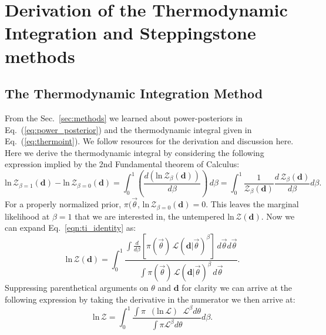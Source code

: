 \section{Derivation of the Thermodynamic Integration and Steppingstone methods}\label{sec:ti_ss_method_derivation}
\subsection{The Thermodynamic Integration Method}
From the Sec.~\ref{sec:methods} we learned about power-posteriors in Eq.~(\ref{eq:power_posterior}) and the thermodynamic integral given in Eq.~(\ref{eq:thermoint}). We follow resources \citep{annis2019thermodynamic} for the derivation and discussion here. Here we derive the thermodynamic integral by considering the following expression implied by the 2nd Fundamental theorem of Calculus:
\begin{equation}\label{eqn:ti_identity}
    \mathrm{ln} \, \mathcal{Z}_{\beta=1}\left(\mathbf{d}\right) - \mathrm{ln} \, \mathcal{Z}_{\beta=0}\left(\mathbf{d}\right) = \int^1_0 \left(\frac{d\left(\mathrm{ln} \, \mathcal{Z}_\beta \left(\mathbf{d}\right) \right)}{d\beta}\right) \, d\beta = \int^1_0 \frac{1}{\mathcal{Z}_\beta \left(\mathbf{d}\right)} \frac{d \, \mathcal{Z}_\beta \left(\mathbf{d}\right)}{d\beta} d\beta.
\end{equation}
For a properly normalized prior, $\pi(\vec{\theta}$, $\mathrm{ln} \, \mathcal{Z}_{\beta=0} \left(\mathbf{d}\right) = 0$. This leaves the marginal likelihood at $\beta=1$ that we are interested in, the untempered $\mathrm{ln} \, \mathcal{Z} \left(\mathbf{d}\right)$. Now we can expand Eq.~\ref{eqn:ti_identity} as:
\begin{equation}
    \mathrm{ln} \, \mathcal{Z} \left(\mathbf{d}\right) = \int_0^1 \frac{\int \frac{d}{d\beta} \left[\pi\left(\vec{\theta}\right) \, \mathcal{L} \left(\mathbf{d}|\vec{\theta} \right)^\beta \right]\, d\vec{\theta} d\vec{\theta}}{\int \pi\left(\vec{\theta}\right) \, \mathcal{L}\left(\mathbf{d}|\vec{\theta} \right)^\beta \, d\vec{\theta}}.
\end{equation}
Suppressing parenthetical arguments on $\theta$ and $\mathbf{d}$ for clarity we can arrive at the following expression by taking the derivative in the numerator we then arrive at:
\begin{equation}
    \mathrm{ln} \, \mathcal{Z} = \int^1_0 \frac{\int \pi \, \, \, \left(\mathrm{ln} \, \mathcal{L}\right) \, \, \, \mathcal{L}^{\beta} d\theta}{\int \pi \mathcal{L}^{\beta} d\theta} d\beta.
\end{equation}
